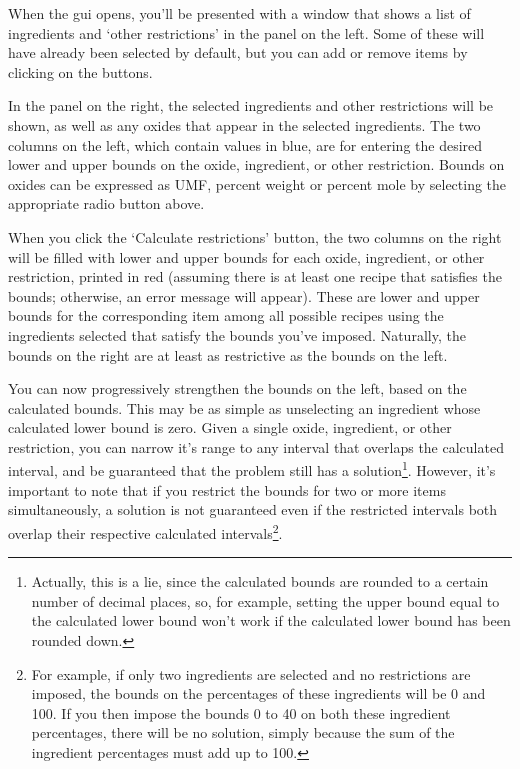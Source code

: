 \documentclass[a4paper,10pt]{article}
\begin{document}
When the gui opens, you'll be presented with a window that shows a list of ingredients and `other restrictions' in the panel on the left. Some of these will have already been selected by default, but you can add or remove items by clicking on the buttons.

In the panel on the right, the selected ingredients and other restrictions will be shown, as well as any oxides that appear in the selected ingredients. The two columns on the left, which contain values in blue, are for entering the desired lower and upper bounds on the oxide, ingredient, or other restriction. Bounds on oxides can be expressed as UMF, percent weight or percent mole by selecting the appropriate radio button above. 

When you click the `Calculate restrictions' button, the two columns on the right will be filled with lower and upper bounds for each oxide, ingredient, or other restriction, printed in red (assuming there is at least one recipe that satisfies the bounds; otherwise, an error message will appear). These are lower and upper bounds for the corresponding item among all possible recipes using the ingredients selected that satisfy the bounds you've imposed. Naturally, the bounds on the right are at least as restrictive as the bounds on the left.

You can now progressively strengthen the bounds on the left, based on the calculated bounds. This may be as simple as unselecting an ingredient whose calculated lower bound is zero. Given a single oxide, ingredient, or other restriction, you can narrow it's range to any interval that overlaps the calculated interval, and be guaranteed that the problem still has a solution\footnote{Actually, this is a lie, since the calculated bounds are rounded to a certain number of decimal places, so, for example, setting the upper bound equal to the calculated lower bound won't work if the calculated lower bound has been rounded down.}. However, it's important to note that if you restrict the bounds for two or more items simultaneously, a solution is not guaranteed even if the restricted intervals both overlap their respective calculated intervals\footnote{For example, if only two ingredients are selected and no restrictions are imposed, the bounds on the percentages of these ingredients will be 0 and 100. If you then impose the bounds 0 to 40 on both these ingredient percentages, there will be no solution, simply because the sum of the ingredient percentages must add up to 100.}.
\end{document}
